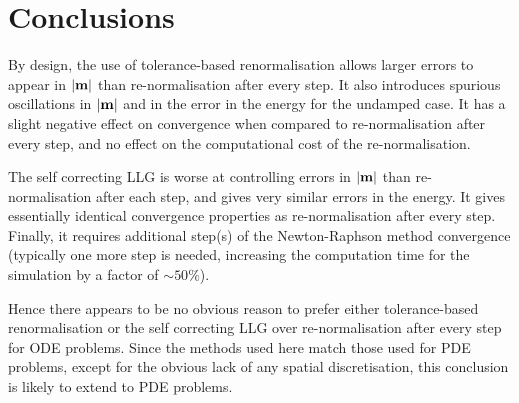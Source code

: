 \section{Conclusions}

By design, the use of tolerance-based renormalisation allows larger errors to appear in $\left|{\boldsymbol{\mathrm{m}}} \right|$ than re-normalisation after every step.
It also introduces spurious oscillations in $\left|{\boldsymbol{\mathrm{m}}} \right|$ and in the error in the energy for the undamped case.
It has a slight negative effect on convergence when compared to re-normalisation after every step, and no effect on the computational cost of the re-normalisation.

The self correcting LLG is worse at controlling errors in $\left|{\boldsymbol{\mathrm{m}}} \right|$ than re-normalisation after each step, and gives very similar errors in the energy.
It gives essentially identical convergence properties as re-normalisation after every step.
Finally, it requires additional step(s) of the Newton-Raphson method convergence (typically one more step is needed, increasing the computation time for the simulation by a factor of $\sim 50\%$).

Hence there appears to be no obvious reason to prefer either tolerance-based renormalisation or the self correcting LLG over re-normalisation after every step for ODE problems.
Since the methods used here match those used for PDE problems, except for the obvious lack of any spatial discretisation, this conclusion is likely to extend to PDE problems.


